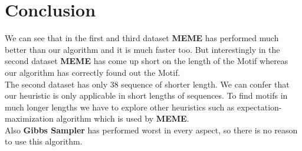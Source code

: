 \documentclass{article}
\begin{document}
\section{Conclusion}
We can see that in the first and third dataset \textbf{MEME} has performed much better than our algorithm and it is much faster too. But interestingly in the second dataset \textbf{MEME} has come up short on the length of the Motif whereas our algorithm has correctly found out the Motif.\\
The second dataset has only 38 sequence of shorter length. We can confer that our heuristic is only applicable in short lengths of sequences. To find motifs in much longer lengths we have to explore other heuristics such as expectation-maximization algorithm which is used by \textbf{MEME}.\\
Also \textbf{Gibbs Sampler} has performed worst in every aspect, so there is no reason to use this algorithm.
\end{document}
